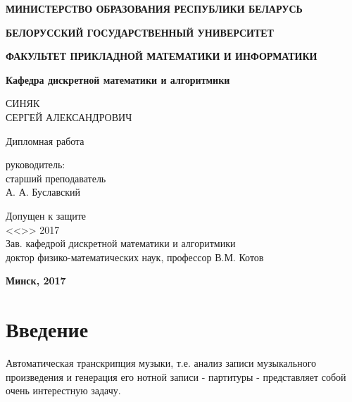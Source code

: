 \documentclass[oneside, final, 12pt]{extarticle}
\begin{document}
\begin{titlepage}


\centerline{\bf МИНИСТЕРСТВО ОБРАЗОВАНИЯ РЕСПУБЛИКИ БЕЛАРУСЬ}
\bigskip
\bigskip
\centerline{\bf БЕЛОРУССКИЙ ГОСУДАРСТВЕННЫЙ УНИВЕРСИТЕТ}
\bigskip
\bigskip
\centerline{\bf ФАКУЛЬТЕТ ПРИКЛАДНОЙ МАТЕМАТИКИ И ИНФОРМАТИКИ}
\bigskip
\bigskip
\centerline{\bf Кафедра дискретной математики и алгоритмики}
\vfill
\vfill
\begin{centering}
  {СИНЯК \\
  СЕРГЕЙ АЛЕКСАНДРОВИЧ}

\end{centering}
\bigskip
{}
\vfill
\begin{centering}
  {Дипломная работа}
\end{centering}
\vfill
\vfill
\hfill
\begin{minipage}{0.35\textwidth}
  {{ руководитель:}\\
  старший преподаватель\\
  {\small А. А. Буславский}}
\end{minipage}
\vfill
\noindent
\begin{minipage}{0.75\textwidth}
  \raggedright
  {Допущен к защите\\
  <<\underline{\quad\quad}>> \underline{\hspace{2.5cm}} 2017\\
  Зав. кафедрой дискретной математики и алгоритмики\\
  доктор физико-математических наук, профессор В.М. Котов}
\end{minipage}
\hfill
\begin{minipage}{0.15\textwidth}
  \raggedright
  \quad
\end{minipage}
\vfill
\centerline{\large \bf Минск, 2017}

\restoregeometry

\end{titlepage}

\setcounter{page}{2}

\tableofcontents

\cleardoublepage

\section{Введение}
  Автоматическая транскрипция музыки, т.е. анализ записи музыкального
  произведения и генерация его нотной записи - партитуры -
  представляет собой очень интерестную задачу.
\end{document}
